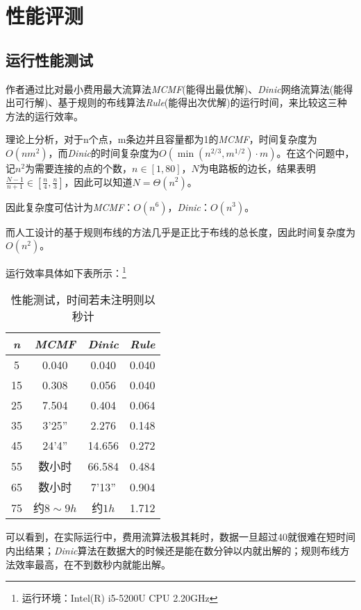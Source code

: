 \section{性能评测}

\subsection{运行性能测试}
\qquad
作者通过比对最小费用最大流算法\emph{MCMF}(能得出最优解)、\emph{Dinic}网络流算法(能得出可行解)、基于规则的布线算法\emph{Rule}(能得出次优解)的运行时间，来比较这三种方法的运行效率。

理论上分析，对于n个点，m条边并且容量都为1的\emph{MCMF}，时间复杂度为$O(nm^2)$，而\emph{Dinic}的时间复杂度为$O(\min{(n^{2/3},m^{1/2})}\cdot m)$。在这个问题中，记$n^2$为需要连接的点的个数，$n\in [1,80]$，$N$为电路板的边长，结果表明$\frac{N - 1}{n + 1}\in [\frac{n}{4}, \frac{n}{3}]$，因此可以知道$N = \Theta(n^2)$。

因此复杂度可估计为\emph{MCMF}：$O(n^6)$，\emph{Dinic}：$O(n^3)$。

而人工设计的基于规则布线的方法几乎是正比于布线的总长度，因此时间复杂度为$O(n^2)$。

运行效率具体如下表所示：\footnote{运行环境：Intel(R) i5-5200U CPU 2.20GHz}

\begin{table}[H]
\label{tab:1}
\centering
\begin{tabular}{|c|c|c|c|}
\hline
\emph{n} & \emph{MCMF} & \emph{Dinic} & \emph{Rule}\\
\hline
5 & 0.040& 0.040& 0.040\\
\hline
15 & 0.308&0.056 & 0.040\\
\hline
25 & 7.504& 0.404& 0.064\\
\hline
35 &3'25'' & 2.276& 0.148\\
\hline
45 &24'4'' & 14.656& 0.272\\
\hline
55 &数小时 &66.584 & 0.484\\
\hline
65 &数小时 &7'13'' & 0.904\\
\hline
75 &约$8\sim 9h$&约$1h$  & 1.712\\
\hline
\end{tabular}
\caption{性能测试，时间若未注明则以秒计}
\end{table} 

可以看到，在实际运行中，费用流算法极其耗时，数据一旦超过40就很难在短时间内出结果；\emph{Dinic}算法在数据大的时候还是能在数分钟以内就出解的；规则布线方法效率最高，在不到数秒内就能出解。

